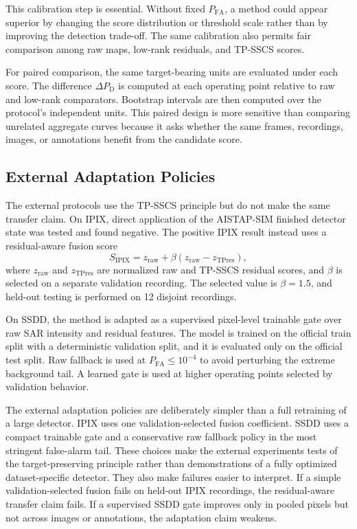 \documentclass[journal]{IEEEtran}
\begin{document}
This calibration step is essential. Without fixed $P_{\mathrm{FA}}$, a method could appear superior by changing the score distribution or threshold scale rather than by improving the detection trade-off. The same calibration also permits fair comparison among raw maps, low-rank residuals, and TP-SSCS scores.

For paired comparison, the same target-bearing units are evaluated under each score. The difference $\Delta P_{\mathrm{D}}$ is computed at each operating point relative to raw and low-rank comparators. Bootstrap intervals are then computed over the protocol's independent units. This paired design is more sensitive than comparing unrelated aggregate curves because it asks whether the same frames, recordings, images, or annotations benefit from the candidate score.

\subsection{External Adaptation Policies}

The external protocols use the TP-SSCS principle but do not make the same transfer claim. On IPIX, direct application of the AISTAP-SIM finished detector state was tested and found negative. The positive IPIX result instead uses a residual-aware fusion score
\begin{equation}
    S_{\mathrm{IPIX}} = z_{\mathrm{raw}} + \beta
    (z_{\mathrm{raw}} - z_{\mathrm{TPres}}),
\end{equation}
where $z_{\mathrm{raw}}$ and $z_{\mathrm{TPres}}$ are normalized raw and TP-SSCS residual scores, and $\beta$ is selected on a separate validation recording. The selected value is $\beta=1.5$, and held-out testing is performed on 12 disjoint recordings.

On SSDD, the method is adapted as a supervised pixel-level trainable gate over raw SAR intensity and residual features. The model is trained on the official train split with a deterministic validation split, and it is evaluated only on the official test split. Raw fallback is used at $P_{\mathrm{FA}} \leq 10^{-4}$ to avoid perturbing the extreme background tail. A learned gate is used at higher operating points selected by validation behavior.

The external adaptation policies are deliberately simpler than a full retraining of a large detector. IPIX uses one validation-selected fusion coefficient. SSDD uses a compact trainable gate and a conservative raw fallback policy in the most stringent false-alarm tail. These choices make the external experiments tests of the target-preserving principle rather than demonstrations of a fully optimized dataset-specific detector. They also make failures easier to interpret. If a simple validation-selected fusion fails on held-out IPIX recordings, the residual-aware transfer claim fails. If a supervised SSDD gate improves only in pooled pixels but not across images or annotations, the adaptation claim weakens.
\end{document}
